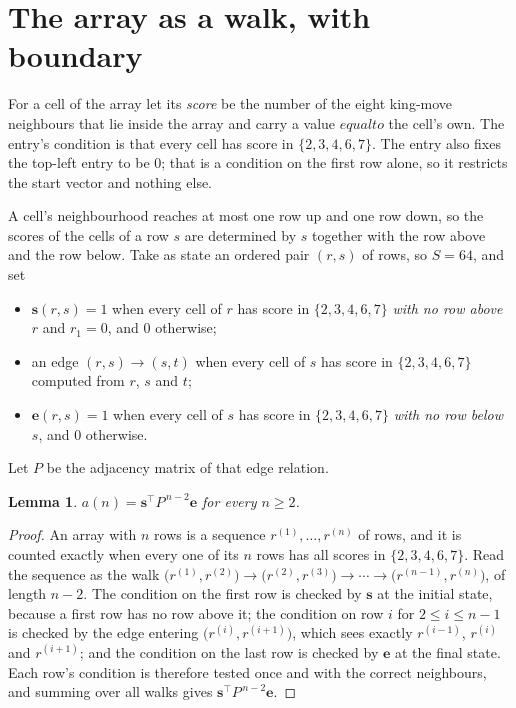 \documentclass[11pt,a4paper]{article}
\theoremstyle{plain}
\newtheorem{lemma}[theorem]{Lemma}
\theoremstyle{definition}
\begin{document}
\section{The array as a walk, with boundary}

For a cell of the array let its \emph{score} be the number of the eight king-move neighbours that lie inside
the array and carry a value $equal to$ the cell's own. The entry's condition is that every cell
has score in $\{2,3,4,6,7\}$. The entry also fixes the top-left entry to be $0$; that is a condition on the first row alone, so it restricts the start vector and nothing else.

A cell's neighbourhood reaches at most one row up and one row down, so the scores of the
cells of a row $s$ are determined by $s$ together with the row above and the row below.
Take as state an ordered pair $(r,s)$ of rows, so $S=64$, and set
\begin{itemize}
\item $\mathbf{s}(r,s)=1$ when every cell of $r$ has score in $\{2,3,4,6,7\}$ \emph{with no row
above $r$} and $r_1=0$, and $0$ otherwise;
\item an edge $(r,s)\to(s,t)$ when every cell of $s$ has score in $\{2,3,4,6,7\}$ computed from
$r$, $s$ and $t$;
\item $\mathbf{e}(r,s)=1$ when every cell of $s$ has score in $\{2,3,4,6,7\}$ \emph{with no row
below $s$}, and $0$ otherwise.
\end{itemize}
Let $P$ be the adjacency matrix of that edge relation.

\begin{lemma}\label{lem:walk}
$a(n)=\mathbf{s}^{\!\top}P^{\,n-2}\mathbf{e}$ for every $n\ge2$.
\end{lemma}

\begin{proof}
An array with $n$ rows is a sequence $r^{(1)},\dots,r^{(n)}$ of rows, and it is counted
exactly when every one of its $n$ rows has all scores in $\{2,3,4,6,7\}$. Read the sequence as the
walk $\bigl(r^{(1)},r^{(2)}\bigr)\to\bigl(r^{(2)},r^{(3)}\bigr)\to\cdots\to
\bigl(r^{(n-1)},r^{(n)}\bigr)$, of length $n-2$. The condition on the first row is
checked by $\mathbf{s}$ at the initial state, because a first row has no row above it; the
condition on row $i$ for $2\le i\le n-1$ is checked by the edge entering
$\bigl(r^{(i)},r^{(i+1)}\bigr)$, which sees exactly $r^{(i-1)}$, $r^{(i)}$ and
$r^{(i+1)}$; and the condition on the last row is checked by $\mathbf{e}$ at the final
state. Each row's condition is therefore tested once and with the correct neighbours, and
summing over all walks gives $\mathbf{s}^{\!\top}P^{\,n-2}\mathbf{e}$.
\end{proof}
\end{document}
